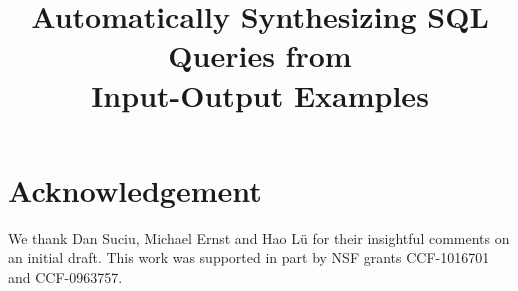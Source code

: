 \documentclass[conference]{IEEEtran}
\begin{document}
\title{Automatically Synthesizing SQL Queries from \\Input-Output Examples}



\author{
}


\maketitle






\vspace{-1mm}


\vspace{-1mm}


\vspace{-1mm}


\vspace{-1mm}


\vspace{-1mm}


\vspace{-1mm}






\vspace{-1mm}

\section{Acknowledgement}

We thank Dan Suciu, Michael Ernst and Hao L{\"u} for their insightful comments
on an initial draft. This
work was supported in part by NSF grants
CCF-1016701 and CCF-0963757.


%
%



\end{document}
